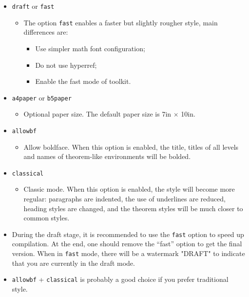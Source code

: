 \documentclass{simplivre}
\newenvironment{remind}[1][Remind]{%
    \LocallyStopLineNumbers%
    \begin{tcolorbox}[breakable,
        enhanced,
        width = \textwidth,
        colback = white, colbacktitle = paper,
        colframe = gray!50, boxrule=0.2mm,
        coltitle = black,
        fonttitle = \sffamily,
        attach boxed title to top left = {yshift=-\tcboxedtitleheight/2,  xshift=\tcboxedtitlewidth/4},
        boxed title style = {boxrule=0pt, colframe=paper},
        before skip = 0.3cm,
        after skip = 0.3cm,
        top = 3mm,
        bottom = 3mm,
        title={\sffamily #1}]%
}{\end{tcolorbox}\ResumeLineNumbers}
\begin{document}
\begin{itemize}
    \item \texttt{draft} or \texttt{fast}
        \begin{itemize}
            \item The option \verb|fast| enables a faster but slightly rougher style, main differences are:
            \begin{itemize}
                \item Use simpler math font configuration; 
                \item Do not use hyperref; 
                \item Enable the fast mode of \ProjLib{} toolkit.
            \end{itemize}
        \end{itemize}
    \item \texttt{a4paper} or \texttt{b5paper}
        \begin{itemize}
            \item Optional paper size. The default paper size is 7in $\times$ 10in.
        \end{itemize}
    \item \texttt{allowbf}
        \begin{itemize}
            \item Allow boldface. When this option is enabled, the title, titles of all levels and names of theorem-like environments will be bolded.
        \end{itemize}
    \item \texttt{classical}
        \begin{itemize}
            \item Classic mode. When this option is enabled, the style will become more regular: paragraphs are indented, the use of underlines are reduced, heading styles are changed, and the theorem styles will be much closer to common styles.
        \end{itemize}
\end{itemize}

\begin{remind}
    \begin{itemize}
        \item During the draft stage, it is recommended to use the \verb|fast| option to speed up compilation. At the end, one should remove the ``fast'' option to get the final version. When in \verb|fast| mode, there will be a watermark "DRAFT" to indicate that you are currently in the draft mode.
        \item \texttt{allowbf} + \texttt{classical} is probably a good choice if you prefer traditional style.
    \end{itemize}
\end{remind}
\end{document}
